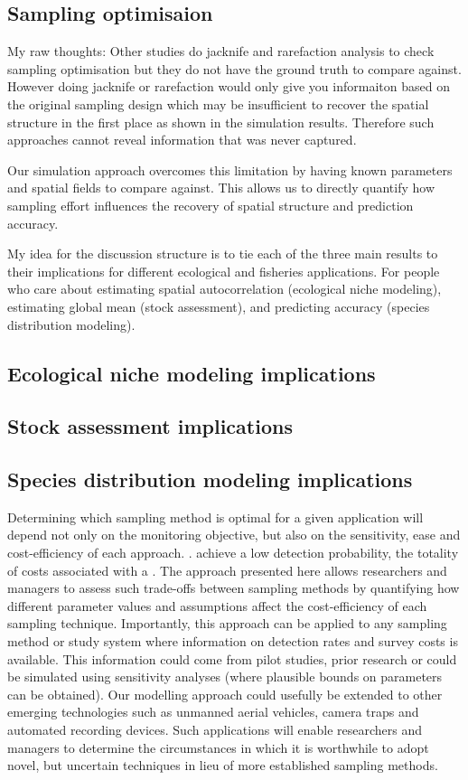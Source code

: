 \documentclass{article}
\begin{document}
\subsection{Sampling optimisaion}
My raw thoughts:
Other studies do jacknife and rarefaction analysis to check sampling optimisation but they do not have the ground truth to compare against. However doing jacknife or rarefaction would only give you informaiton based on the original sampling design which may be insufficient to recover the spatial structure in the first place as shown in the simulation results. Therefore such approaches cannot reveal information that was never captured. 

Our simulation approach overcomes this limitation by having known parameters and spatial fields to compare against. This allows us to directly quantify how sampling effort influences the recovery of spatial structure and prediction accuracy.

My idea for the discussion structure is to tie each of the three main results to their implications for different ecological and fisheries applications. For people who care about estimating spatial autocorrelation (ecological niche modeling), estimating global mean (stock assessment), and predicting accuracy (species distribution modeling).

\subsection{Ecological niche modeling implications}
\subsection{Stock assessment implications}
\subsection{Species distribution modeling implications}



Determining which sampling method is optimal for a given application will depend not only on the monitoring objective, but also on the sensitivity, ease and cost-efficiency of each approach. . achieve a low detection probability, the totality of costs associated with a . The approach presented here allows researchers and managers to assess such trade-offs between sampling methods by quantifying how different parameter values and assumptions affect the cost-efficiency of each sampling technique. Importantly, this approach can be applied to any sampling method or study system where information on detection rates and survey costs is available. This information could come from pilot studies, prior research or could be simulated using sensitivity analyses (where plausible bounds on parameters can be obtained). Our modelling approach could usefully be extended to other emerging technologies such as unmanned aerial vehicles, camera traps and automated recording devices. Such applications will enable researchers and managers to determine the circumstances in which it is worthwhile to adopt novel, but uncertain techniques in lieu of more established sampling methods.
\cite{smart2016}
\end{document}

